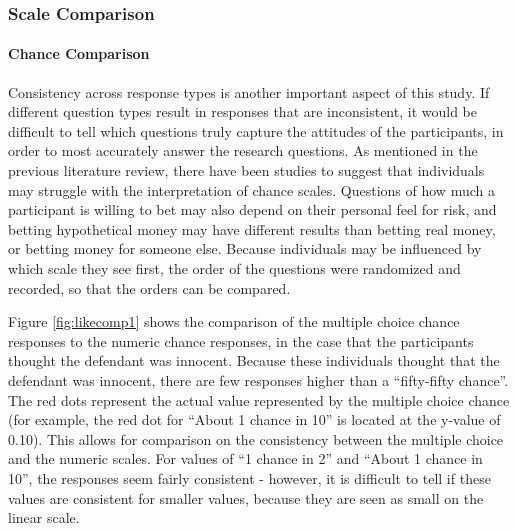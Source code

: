 \documentclass[print]{nuthesis}
\begin{document}
\hypertarget{scale-comparison}{%
\subsubsection{Scale Comparison}\label{scale-comparison}}

\hypertarget{chance-comparison}{%
\paragraph{Chance Comparison}\label{chance-comparison}}

Consistency across response types is another important aspect of this study.
If different question types result in responses that are inconsistent, it would be difficult to tell which questions truly capture the attitudes of the participants, in order to most accurately answer the research questions.
As mentioned in the previous literature review, there have been studies to suggest that individuals may struggle with the interpretation of chance scales.
Questions of how much a participant is willing to bet may also depend on their personal feel for risk, and betting hypothetical money may have different results than betting real money, or betting money for someone else.
Because individuals may be influenced by which scale they see first, the order of the questions were randomized and recorded, so that the orders can be compared.

Figure \ref{fig:likecomp1} shows the comparison of the multiple choice chance responses to the numeric chance responses, in the case that the participants thought the defendant was innocent.
Because these individuals thought that the defendant was innocent, there are few responses higher than a ``fifty-fifty chance''.
The red dots represent the actual value represented by the multiple choice chance (for example, the red dot for ``About 1 chance in 10'' is located at the y-value of 0.10).
This allows for comparison on the consistency between the multiple choice and the numeric scales.
For values of ``1 chance in 2'' and ``About 1 chance in 10'', the responses seem fairly consistent - however, it is difficult to tell if these values are consistent for smaller values, because they are seen as small on the linear scale.
\end{document}
